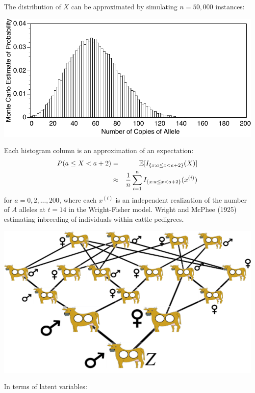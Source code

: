 The distribution of $X$ can be approximated by simulating $n=50,000$ instances:
\begin{center}
\includegraphics[width=.6\textwidth]{illus/wfhist.pdf}
\end{center} 
Each histogram column is an approximation of an expectation:
\begin{eqnarray}
		P(a\leq X<a+2) & = & \Bbb{E}[I_{\{x:a\leq x<a+2\}}(X)] \nonumber  \\
		&\approx & \displaystyle \frac{1}{n}
		\sum_{i=1}^n I_{\{x:a\leq x<a+2\}}(x^{(i)}) \nonumber
\end{eqnarray}
for $a=0,2,\ldots,200$, where each $x^{(i)}$ is an independent realization of the 
number of $A$ alleles at $t=14$ in the Wright-Fisher model.
 Wright and McPhee (1925) estimating inbreeding of individuals within cattle pedigrees.
\begin{center}
\includegraphics[width=.83\textwidth]{illus/cows.pdf}
\end{center}
In terms of latent variables:

